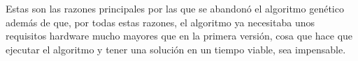 Estas son las razones principales por las que se abandonó el algoritmo genético además de que, por todas estas razones, el algoritmo ya necesitaba unos requisitos hardware mucho mayores que en la primera versión, cosa que hace que ejecutar el algoritmo y tener una solución en un tiempo viable, sea impensable.